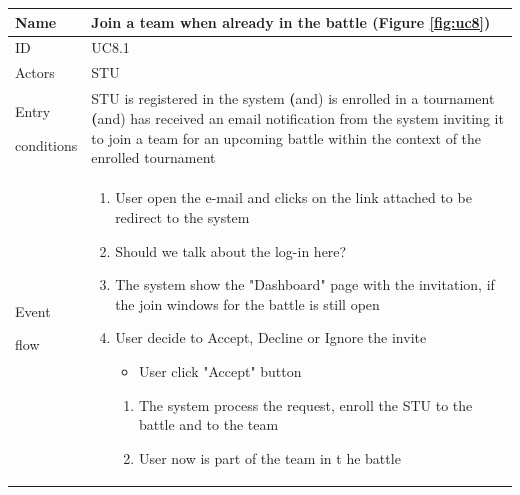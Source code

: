 \begin{center}
    \def\arraystretch{1.5}
    \begin{tabular}{| m{2cm} | m{10cm}|}
        \hline
        Name                  & Join a team when already in the battle (Figure \ref{fig:uc8}) \\ \hline
        ID                    & UC8.1                                   \\ \hline
        Actors                & STU                                   \\ \hline
        Entry \par conditions & STU is registered in the system 
                                    \textbf(and) is enrolled in a tournament 
                                    \textbf(and) has received an email notification from the system inviting it to join a team for an upcoming battle within the context of the enrolled tournament                                     \\ \hline
        Event \par flow       & \begin{enumerate}
                                    \item User open the e-mail and clicks on the link attached to be redirect to the system
                                    \item {\color{red} Should we talk about the log-in here?}
                                    \item The system show the "Dashboard" page with the invitation, if the join windows for the battle is still open
                                    \item User decide to Accept, Decline or Ignore the invite 
                                        \begin{itemize}
                                            \item User click "Accept" button
                                        \end{itemize} 
                                            \begin{enumerate}
                                                \item The system process the request, enroll the STU to the battle and to the team
                                                \item User now is part of the team in t
                                                he battle
                                            \end{enumerate}

\end{enumerate}
\end{tabular}
\end{center}
